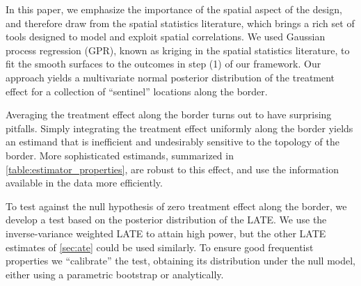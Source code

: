 In this paper, we emphasize the importance of the spatial aspect of the design, and therefore draw from the spatial statistics literature, which brings a rich set of tools designed to model and exploit spatial correlations.
We used Gaussian process regression (GPR), known as kriging in the spatial statistics literature, to fit the smooth surfaces to the outcomes in step (1) of our framework.
Our approach yields a multivariate normal posterior distribution of the treatment effect for a collection of ``sentinel'' locations along the border.

Averaging the treatment effect along the border turns out to have surprising pitfalls.
Simply integrating the treatment effect uniformly along the border yields an estimand that is inefficient and undesirably sensitive to the topology of the border.
More sophisticated estimands, summarized in \autoref{table:estimator_properties}, are robust to this effect, and use the information available in the data more efficiently.

To test against the null hypothesis of zero treatment effect along the border, we develop a test based on the posterior distribution of the LATE.
We use the inverse-variance weighted LATE to attain high power, but the other LATE estimates of \autoref{sec:ate} could be used similarly.
To ensure good frequentist properties we “calibrate” the test, obtaining its distribution under the null model, either using a parametric bootstrap or analytically.


